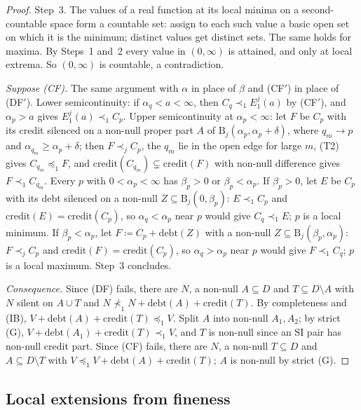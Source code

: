 \documentclass[11pt]{article}
\theoremstyle{definition}\newtheorem{definition}[theorem]{Definition}
\theoremstyle{remark}\newtheorem{remark}[theorem]{Remark}
\newcommand{\debt}{\mathrm{debt}}
\newcommand{\cred}{\mathrm{credit}}
\newcommand{\Band}{\mathrm{B}}
\begin{document}
\begin{proof}
Step~3. The values of a real function at its local minima on a
second-countable space form a countable set: assign to each such value a
basic open set on which it is the minimum; distinct values get distinct
sets. The same holds for maxima. By Steps~1 and~2 every value in
$(0,\infty)$ is attained, and only at local extrema. So $(0,\infty)$ is
countable, a contradiction.

\emph{Suppose (CF).} The same argument with $\alpha$ in place of $\beta$ and
(CF$'$) in place of (DF$'$). Lower semicontinuity: if $\alpha_q<a<\infty$,
then $C_q\prec_1E^j_1(a)$ by (CF$'$), and $\alpha_p>a$ gives
$E^j_1(a)\prec_1C_p$. Upper semicontinuity at $\alpha_p<\infty$: let $F$ be
$C_p$ with its credit silenced on a non-null proper part $A$ of
$\Band_j(\alpha_p,\alpha_p+\delta)$, where $q_m\to p$ and
$\alpha_{q_m}\ge\alpha_p+\delta$; then $F\prec_jC_p$, the $q_m$ lie in the
open edge for large $m$, (T2) gives $C_{q_m}\preceq_1F$, and
$\cred(C_{q_m})\subsetneq\cred(F)$ with non-null difference gives
$F\prec_1C_{q_m}$. Every $p$ with $0<\alpha_p<\infty$ has $\beta_p>0$ or
$\beta_p<\alpha_p$. If $\beta_p>0$, let $E$ be $C_p$ with its debt silenced
on a non-null $Z\subseteq\Band_j(0,\beta_p)$: $E\prec_1C_p$ and
$\cred(E)=\cred(C_p)$, so $\alpha_q<\alpha_p$ near $p$ would give
$C_q\prec_1E$; $p$ is a local minimum. If $\beta_p<\alpha_p$, let
$F\coloneqq C_p+\debt(Z)$ with a non-null $Z\subseteq\Band_j(\beta_p,\alpha_p)$:
$F\prec_jC_p$ and $\cred(F)=\cred(C_p)$, so $\alpha_q>\alpha_p$ near $p$
would give $F\prec_1C_q$; $p$ is a local maximum. Step~3 concludes.

\emph{Consequence.} Since (DF) fails, there are $N$, a non-null
$A\subseteq D$ and $T\subseteq D\setminus A$ with $N$ silent on $A\cup T$
and $N\not\prec_1N+\debt(A)+\cred(T)$. By completeness and (IB),
$V+\debt(A)+\cred(T)\preceq_1V$. Split $A$ into non-null $A_1,A_2$; by
strict (G), $V+\debt(A_1)+\cred(T)\prec_1V$, and $T$ is non-null since an SI
pair has non-null credit part. Since (CF) fails, there are $N$, a non-null
$T\subseteq D$ and $A\subseteq D\setminus T$ with
$V\preceq_1V+\debt(A)+\cred(T)$; $A$ is non-null by strict (G).
\end{proof}

\subsection{Local extensions from fineness}
\end{document}
